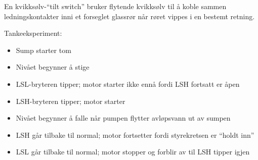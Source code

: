 
En kvikksølv-``tilt switch'' bruker flytende kvikksølv til å koble sammen ledningskontakter inni et forseglet glassrør når røret vippes i en bestemt retning.

\vskip 10pt

\noindent
Tankeeksperiment:

\begin{itemize}
\item{} Sump starter tom
\item{} Nivået begynner å stige
\item{} LSL-bryteren tipper; motor starter ikke ennå fordi LSH fortsatt er åpen
\item{} LSH-bryteren tipper; motor starter
\item{} Nivået begynner å falle når pumpen flytter avløpsvann ut av sumpen
\item{} LSH går tilbake til normal; motor fortsetter fordi styrekretsen er ``holdt inn''
\item{} LSL går tilbake til normal; motor stopper og forblir av til LSH tipper igjen
\end{itemize}


